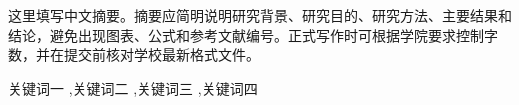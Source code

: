 \jnabstract[zh]   %
这里填写中文摘要。摘要应简明说明研究背景、研究目的、研究方法、主要结果和结论，避免出现图表、公式和参考文献编号。正式写作时可根据学院要求控制字数，并在提交前核对学校最新格式文件。


\begin{jnkeywords}
关键词一 \sep 关键词二 \sep 关键词三 \sep 关键词四
\end{jnkeywords}
